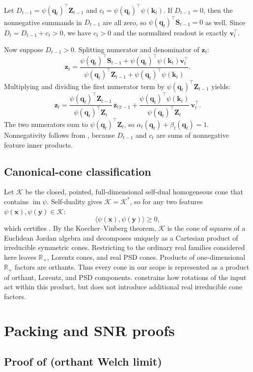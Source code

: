 \documentclass{article}
\newcommand{\1}{\bm{1}}
\newcommand{\lrangle}[1]{\langle#1\rangle}
\def\vk{{\bm{k}}}
\def\vq{{\bm{q}}}
\def\vv{{\bm{v}}}
\def\vx{{\bm{x}}}
\def\vy{{\bm{y}}}
\def\vz{{\bm{z}}}
\def\mS{{\bm{S}}}
\def\mZ{{\bm{Z}}}
\def\gK{{\mathcal{K}}}
\newcommand{\R}{\mathbb{R}}
\theoremstyle{definition}
\begin{document}
Let $D_{t-1}=\psi(\vq_t)^\top\mZ_{t-1}$ and $c_t=\psi(\vq_t)^\top\psi(\vk_t)$. If $D_{t-1}=0$, then
the nonnegative summands in $D_{t-1}$ are all zero, so $\psi(\vq_t)^\top\mS_{t-1}=0$ as well. Since
$D_t=D_{t-1}+c_t>0$, we have $c_t>0$ and the normalized readout is exactly $\vv_t^\top$.

Now suppose $D_{t-1}>0$. Splitting numerator and denominator of $\vz_t$:
\[
  \vz_t =
  \frac{\psi(\vq_t)^\top \mS_{t-1}
    + \psi(\vq_t)^\top\psi(\vk_t)\vv_t^\top}
  {\psi(\vq_t)^\top \mZ_{t-1}+\psi(\vq_t)^\top\psi(\vk_t)}.
\]
Multiplying and dividing the first numerator term by $\psi(\vq_t)^\top\mZ_{t-1}$ yields:
\[
  \vz_t =
  \frac{\psi(\vq_t)^\top\mZ_{t-1}}{\psi(\vq_t)^\top\mZ_t}\,
  \bar\vz_{t|t-1}
  + \frac{\psi(\vq_t)^\top\psi(\vk_t)}{\psi(\vq_t)^\top\mZ_t}\,
  \vv_t^\top .
\]
The two numerators sum to $\psi(\vq_t)^\top\mZ_t$, so $\alpha_t(\vq_t)+\beta_t(\vq_t)=1$.
Nonnegativity follows from , because $D_{t-1}$ and $c_t$ are sums of nonnegative
feature inner products.

\subsection{Canonical-cone classification}

Let $\gK$ be the closed, pointed, full-dimensional self-dual homogeneous cone that contains
$\operatorname{im}\psi$. Self-duality gives $\gK=\gK^*$, so for any two features
$\psi(\vx),\psi(\vy)\in\gK$:
\[
  \lrangle{\psi(\vx),\psi(\vy)}\ge0,
\]
which certifies . By the Koecher--Vinberg theorem, $\gK$ is the cone of squares of a
Euclidean Jordan algebra and decomposes uniquely as a Cartesian product of irreducible symmetric
cones. Restricting to the ordinary real families considered here leaves $\R_+$, Lorentz cones, and
real PSD cones. Products of one-dimensional $\R_+$ factors are orthants. Thus every cone in our
scope is represented as a product of orthant, Lorentz, and PSD components.  constrains how
rotations of the input act within this product, but does not introduce additional real irreducible
cone factors.



\section{Packing and SNR proofs}
\label{app:packing}

\subsection{\texorpdfstring{Proof of  (orthant Welch limit)}{Proof of orthant Welch limit}}
\end{document}
